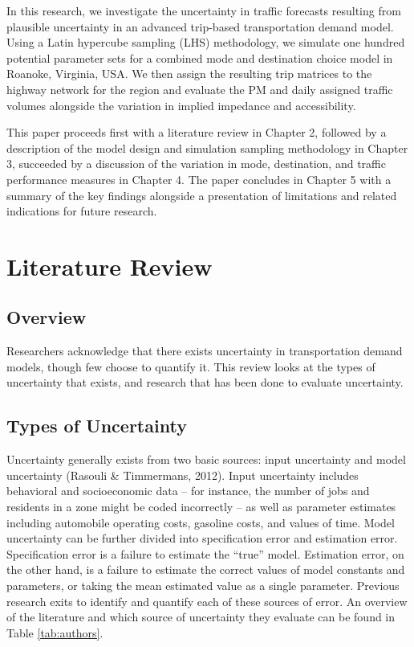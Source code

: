 \documentclass[fancy, masters,twoside]{byuthesis}
\begin{document}
In this research, we investigate the uncertainty in traffic forecasts resulting from plausible uncertainty in an advanced trip-based transportation demand model. Using a Latin hypercube sampling (LHS) methodology, we simulate one hundred potential parameter sets for a combined mode and destination choice model in Roanoke, Virginia, USA. We then assign the resulting trip matrices to the highway network for the region and evaluate the PM and daily assigned traffic volumes alongside the variation in implied impedance and accessibility.

This paper proceeds first with a literature review in Chapter 2, followed by a description of the model design and simulation sampling methodology in Chapter 3, succeeded by a discussion of the variation in mode, destination, and traffic performance measures in Chapter 4. The paper concludes in Chapter 5 with a summary of the key findings alongside a presentation of limitations and related indications for future research.

\hypertarget{literature-review}{%
\chapter{Literature Review}\label{literature-review}}

\hypertarget{overview}{%
\section{Overview}\label{overview}}

Researchers acknowledge that there exists uncertainty in transportation demand models, though few choose to quantify it. This review looks at the types of uncertainty that exists, and research that has been done to evaluate uncertainty.

\hypertarget{types-of-uncertainty}{%
\section{Types of Uncertainty}\label{types-of-uncertainty}}

Uncertainty generally exists from two basic sources: input uncertainty and model uncertainty (Rasouli \& Timmermans, 2012). Input uncertainty includes behavioral and socioeconomic data -- for instance, the number of jobs and residents in a zone might be coded incorrectly -- as well as parameter estimates including automobile operating costs, gasoline costs, and values of time. Model uncertainty can be further divided into specification error and estimation error. Specification error is a failure to estimate the ``true'' model. Estimation error, on the other hand, is a failure to estimate the correct values of model constants and parameters, or taking the mean estimated value as a single parameter. Previous research exits to identify and quantify each of these sources of error. An overview of the literature and which source of uncertainty they evaluate can be found in Table \ref{tab:authors}.
\end{document}
